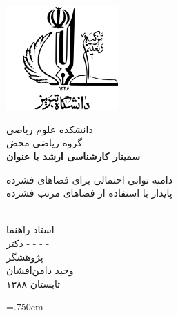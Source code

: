 \documentclass[12pt,a4paper]{article}
\theoremstyle{definition}
\theoremstyle{theorem}
\theoremstyle{definition}
\begin{document}
\thispagestyle{empty}
\vspace*{-19mm}
\centerline{\includegraphics[height=4cm]{logo2.jpg}}

\begin{center}
\vspace{-3mm}
دانشکده علوم ریاضی
\\[.2cm]

گروه ریاضی محض
\\[1.7cm]
{\Large 
\textbf{سمینار کارشناسی ارشد با عنوان}
}
\\[.8cm]
{\titr
\begin{Huge}
دامنه توانی احتمالی برای فضاهای فشرده 
\\[.4cm]
پایدار با استفاده از فضاهای مرتب فشرده
\end{Huge}}
\\[1.3cm]
{\Large {\traffic 
استاد راهنما
}
\\[.7cm]
{\Large \nastaliq دکتر - - - - }
\\[.9cm]
{\Large\traffic  پژوهشگر
}}
\\[.7cm]
{\Large \nastaliq وحید دامن‌افشان}
\\[1.8cm]
 تابستان ۱۳۸۸
\end{center}

\newpage
\baselineskip=1cm
\tableofcontents
\newpage
\baselineskip=.750cm
\end{document}
